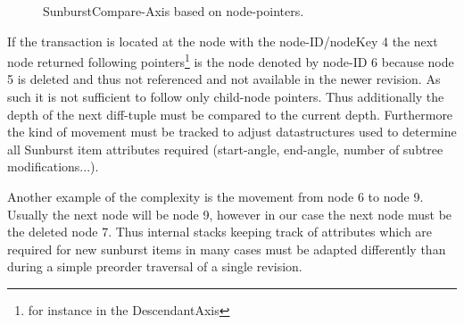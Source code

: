 \begin{figure}[tb]
\caption{\label{fig:tree-axis} SunburstCompare-Axis based on node-pointers.}
\end{figure}

If the transaction is located at the node with the node-ID/nodeKey 4 the next node returned following pointers\footnote{for instance in the DescendantAxis} is the node denoted by node-ID 6 because node 5 is deleted and thus not referenced and not available in the newer revision. As such it is not sufficient to follow only child-node pointers. Thus additionally the depth of the next diff-tuple must be compared to the current depth. Furthermore the kind of movement must be tracked to adjust datastructures used to determine all Sunburst item attributes required (start-angle, end-angle, number of subtree modifications...).

Another example of the complexity is the movement from node 6 to node 9. Usually the next node will be node 9, however in our case the next node must be the deleted node 7. Thus internal stacks keeping track of attributes which are required for new sunburst items in many cases must be adapted differently than during a simple preorder traversal of a single revision.  %

